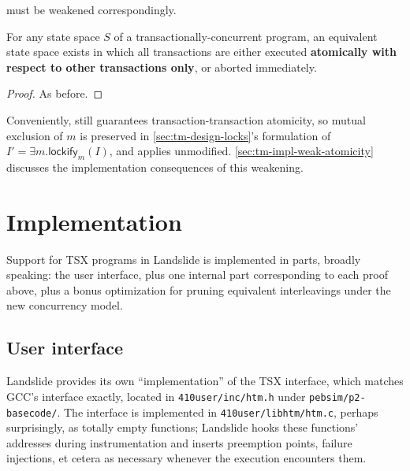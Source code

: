 { must be weakened correspondingly.
\vspace{1em}

\begin{theorem}
	\label{thm:atom-weak}
	For any state space $S$ of a transactionally-concurrent program,
	an equivalent state space exists in which all transactions are either executed
	{\bf atomically
	with respect to other transactions only},
	or aborted immediately.
\end{theorem}

\begin{proof}
	As before.
\end{proof}

Conveniently,
 still guarantees transaction-transaction atomicity,
so mutual exclusion of $m$ is preserved
in \cref{sec:tm-design-locks}'s formulation of
$I' = \exists m. \mathsf{lockify}_m(I)$,
and
 applies unmodified.
\cref{sec:tm-impl-weak-atomicity}
discusses the implementation consequences of this weakening.}


\section{Implementation}
\label{sec:tm-implementation}

Support for TSX programs in Landslide is implemented in  parts, broadly speaking:
the user interface,
plus one internal part corresponding to each proof above,
plus a bonus optimization for pruning equivalent interleavings under the new concurrency model.

\subsection{User interface}
\label{sec:tm-interface}

Landslide provides its own ``implementation'' of the TSX interface,
which matches GCC's interface exactly,
located in {\tt 410user/inc/htm.h}
under {\tt pebsim/p2-basecode/}.
The interface is implemented in {\tt 410user/libhtm/htm.c},
perhaps surprisingly, as totally empty functions;
Landslide hooks these functions' addresses during instrumentation
and inserts preemption points, failure injections,
et cetera as necessary whenever the execution encounters them.

